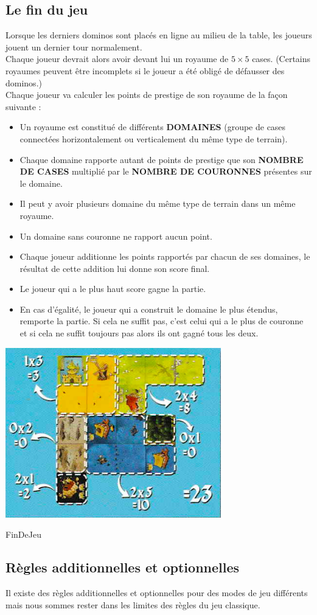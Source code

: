 \newpage
\subsection{Le fin du jeu}

Lorsque les derniers dominos sont placés en ligne au milieu de la table, les joueurs jouent un dernier tour normalement.\\
Chaque joueur devrait alors avoir devant lui un royaume de $5 \times 5$ cases. (Certains royaumes peuvent être incomplets si le joueur a été obligé de défausser des dominos.)\\
Chaque joueur va calculer les points de prestige de son royaume de la façon suivante :
\begin{itemize}
    \item Un royaume est constitué de différents \textbf{DOMAINES} (groupe de cases connectées horizontalement ou verticalement du même type de terrain).
    \item Chaque domaine rapporte autant de points de prestige que son \textbf{NOMBRE DE CASES} multiplié par le \textbf{NOMBRE DE COURONNES} présentes sur le domaine.
    \item Il peut y avoir plusieurs domaine du même type de terrain dans un même royaume.
    \item Un domaine sans couronne ne rapport aucun point.
    \item Chaque joueur additionne les points rapportés par chacun de ses domaines, le résultat de cette addition lui donne son score final.
    \item Le joueur qui a le plus haut score gagne la partie.
    \item En cas d'égalité, le joueur qui a construit le domaine le plus étendus, remporte la partie. Si cela ne suffit pas, c'est celui qui a le plus de couronne et si cela ne suffit toujours pas alors ils ont gagné tous les deux.
\end{itemize}

\begin{center}
  \includegraphics[scale=0.5]{Figures/exFindeJeu.png}
  \caption{FinDeJeu}
\end{center}

\subsection{Règles additionnelles et optionnelles}

Il existe des règles additionnelles et optionnelles pour des modes de jeu différents mais nous sommes rester dans les limites des règles du jeu classique.

